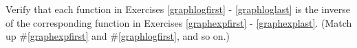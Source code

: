 {Verify that each function in Exercises \ref{graphlogfirst} - \ref{graphloglast} is the inverse of the corresponding function in Exercises \ref{graphexpfirst} - \ref{graphexplast}.  (Match up \#\ref{graphexpfirst} and \#\ref{graphlogfirst}, and so on.)}
{}


